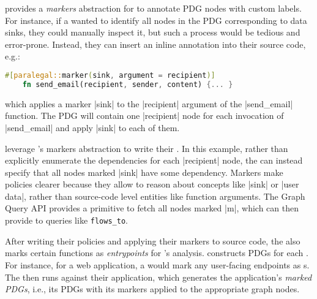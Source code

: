 \sys{} provides a \emph{markers} abstraction for \writers{} to annotate PDG nodes with custom labels.
%
For instance, if a \dev{} wanted to identify all nodes in the PDG corresponding to data sinks,
they could manually inspect it, but such a process would be tedious and error-prone.
%
Instead, they can insert an inline annotation into their source code, 
e.g.:
\begin{lstlisting}[language=Rust]
    #[paralegal::marker(sink, argument = recipient)]
    fn send_email(recipient, sender, content) {... }
\end{lstlisting}
which applies a marker |sink| to the |recipient| argument of the |send_email| function.
%
The PDG will contain one |recipient| node for each invocation of |send_email| and apply |sink| to each of them.

\Writers{} leverage \sys{}'s markers abstraction to write their \policies{}.
%
In this example, rather than explicitly enumerate the dependencies for each |recipient| node,
the \writer{} can instead specify that all nodes marked |sink| have some dependency.
%
Markers make policies clearer because they allow \writers{} to reason about concepts like |sink| or |user data|,
rather than source-code level entities like function arguments.
%
The \sys{} Graph Query API provides a primitive to fetch all nodes marked |m|, 
which \devs{} can then provide to queries like \lstinline[language=Rust]|flows_to|.

After writing their policies and applying their markers to source code,
the \dev{} also marks certain functions as \emph{entrypoints} for \sys{}'s analysis.
%
\sys{} constructs PDGs for each \controller{}.
%
For instance, for a web application, a \dev{} would mark any user-facing endpoints as \controller{}s.
%
The \dev{} then runs \sys{} against their application, which generates the application's \emph{marked PDGs},
i.e., its PDGs with its markers applied to the appropriate graph nodes.
%